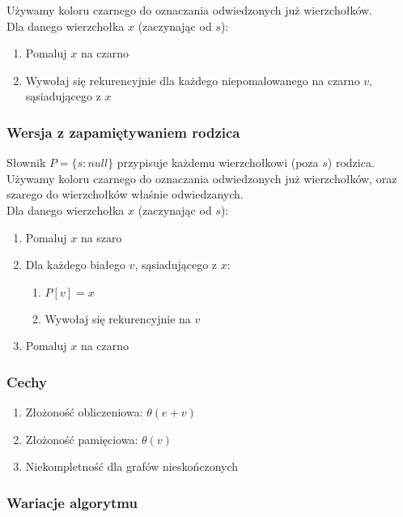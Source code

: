 \documentclass[main.tex]{subfiles}
\begin{document}
    Używamy koloru czarnego do oznaczania odwiedzonych już wierzchołków.\[\]
    Dla danego wierzchołka $x$ (zaczynając od $s$):
    \begin{enumerate}
        \item Pomaluj $x$ na czarno
        \item Wywołaj się rekurencyjnie dla każdego niepomalowanego na czarno $v$,
        sąsiadującego z $x$
    \end{enumerate}


    \subsubsection{Wersja z zapamiętywaniem rodzica}

    Słownik $P = \{s : null\}$ przypisuje każdemu wierzchołkowi (poza $s$) rodzica. Używamy
    koloru czarnego do oznaczania odwiedzonych już wierzchołków, oraz szarego do
    wierzchołków właśnie odwiedzanych.\[\]
    Dla danego wierzchołka $x$ (zaczynając od $s$):
    \begin{enumerate}
        \item Pomaluj $x$ na szaro
        \item Dla każdego białego $v$, sąsiadującego z $x$:
        \begin{enumerate}
            \item $P[v] = x$
            \item Wywołaj się rekurencyjnie na $v$
        \end{enumerate}
        \item Pomaluj $x$ na czarno
    \end{enumerate}

    \subsubsection{Cechy}

    \begin{enumerate}
        \item Złożoność obliczeniowa: $\theta(e + v)$
        \item Złożoność pamięciowa: $\theta(v)$
        \item Niekompletność dla grafów nieskończonych
    \end{enumerate}

    \subsubsection{Wariacje algorytmu}
\end{document}
